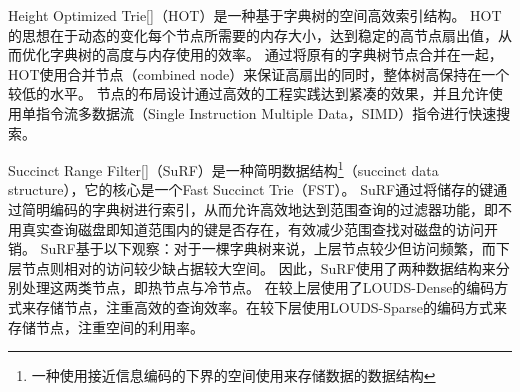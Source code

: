 Height Optimized Trie[]（HOT）是一种基于字典树的空间高效索引结构。
HOT的思想在于动态的变化每个节点所需要的内存大小，达到稳定的高节点扇出值，从而优化字典树的高度与内存使用的效率。
通过将原有的字典树节点合并在一起，HOT使用合并节点（combined node）来保证高扇出的同时，整体树高保持在一个较低的水平。
节点的布局设计通过高效的工程实践达到紧凑的效果，并且允许使用单指令流多数据流（Single Instruction Multiple Data，SIMD）指令进行快速搜索。


Succinct Range Filter[]（SuRF）是一种简明数据结构\footnote{一种使用接近信息编码的下界的空间使用来存储数据的数据结构}（succinct data structure），它的核心是一个Fast Succinct Trie（FST）。
SuRF通过将储存的键通过简明编码的字典树进行索引，从而允许高效地达到范围查询的过滤器功能，即不用真实查询磁盘即知道范围内的键是否存在，有效减少范围查找对磁盘的访问开销。
SuRF基于以下观察：对于一棵字典树来说，上层节点较少但访问频繁，而下层节点则相对的访问较少缺占据较大空间。
因此，SuRF使用了两种数据结构来分别处理这两类节点，即热节点与冷节点。
在较上层使用了LOUDS-Dense的编码方式来存储节点，注重高效的查询效率。在较下层使用LOUDS-Sparse的编码方式来存储节点，注重空间的利用率。


